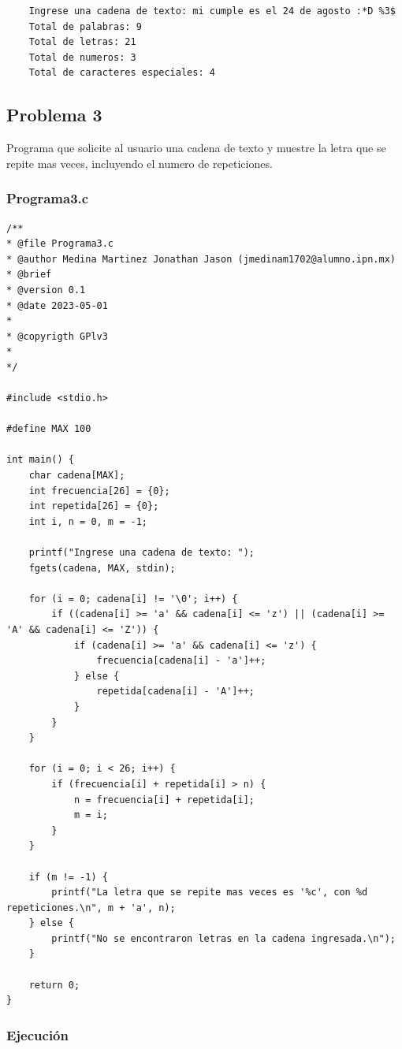 \documentclass{article}
\begin{document}
	\begin{lstlisting}
	Ingrese una cadena de texto: mi cumple es el 24 de agosto :*D %3$
	Total de palabras: 9
	Total de letras: 21
	Total de numeros: 3
	Total de caracteres especiales: 4
	\end{lstlisting}	
	
	\newpage
	
	\subsection{Problema 3}
	
	Programa que solicite al usuario una cadena de texto y muestre la letra que se repite mas veces, incluyendo el numero de repeticiones.
	
	\subsubsection{Programa3.c}
	
	\begin{lstlisting}
/**
* @file Programa3.c
* @author Medina Martinez Jonathan Jason (jmedinam1702@alumno.ipn.mx)
* @brief 
* @version 0.1
* @date 2023-05-01
* 
* @copyrigth GPlv3
* 
*/

#include <stdio.h>

#define MAX 100

int main() {
	char cadena[MAX];
	int frecuencia[26] = {0};
	int repetida[26] = {0};
	int i, n = 0, m = -1;
	
	printf("Ingrese una cadena de texto: ");
	fgets(cadena, MAX, stdin);
	
	for (i = 0; cadena[i] != '\0'; i++) {
		if ((cadena[i] >= 'a' && cadena[i] <= 'z') || (cadena[i] >= 'A' && cadena[i] <= 'Z')) {
			if (cadena[i] >= 'a' && cadena[i] <= 'z') {
				frecuencia[cadena[i] - 'a']++;
			} else {
				repetida[cadena[i] - 'A']++;
			}
		}
	}
	
	for (i = 0; i < 26; i++) {
		if (frecuencia[i] + repetida[i] > n) {
			n = frecuencia[i] + repetida[i];
			m = i;
		}
	}
	
	if (m != -1) {
		printf("La letra que se repite mas veces es '%c', con %d repeticiones.\n", m + 'a', n);
	} else {
		printf("No se encontraron letras en la cadena ingresada.\n");
	}
	
	return 0;
}
	\end{lstlisting}
	
	\subsubsection{Ejecución}
	
\end{document}

